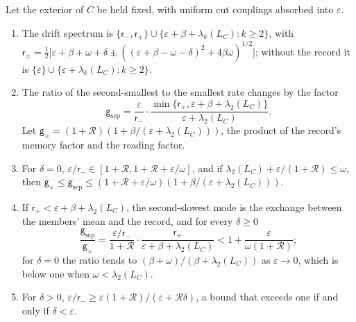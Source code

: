 \begin{proposition}\label{prop:hie-record-gain}
Let the exterior of $C$ be held fixed, with uniform cut couplings absorbed into $\varepsilon$.
\begin{enumerate}
\item[(a)] The drift spectrum is $\{\mathsf r_-,\mathsf r_+\}\cup\{\varepsilon+\beta+\lambda_k(L_C):k\ge2\}$, with $\mathsf r_\pm=\frac12\bigl[\varepsilon+\beta+\omega+\delta\pm((\varepsilon+\beta-\omega-\delta)^2+4\beta\omega)^{1/2}\bigr]$; without the record it is $\{\varepsilon\}\cup\{\varepsilon+\lambda_k(L_C):k\ge2\}$.
\item[(b)] The ratio of the second-smallest to the smallest rate changes by the factor
\begin{equation}\label{eq:hie-gain}
\mathsf g_{\mathrm{sep}}=\frac{\varepsilon}{\mathsf r_-}\cdot\frac{\min\{\mathsf r_+,\varepsilon+\beta+\lambda_2(L_C)\}}{\varepsilon+\lambda_2(L_C)}.
\end{equation}
Let $\mathsf g_\times=(1+\mathcal R)(1+\beta/(\varepsilon+\lambda_2(L_C)))$, the product of the record's memory factor and the reading factor.
\item[(c)] For $\delta=0$, $\varepsilon/\mathsf r_-\in[1+\mathcal R,1+\mathcal R+\varepsilon/\omega]$, and if $\lambda_2(L_C)+\varepsilon/(1+\mathcal R)\le\omega$, then $\mathsf g_\times\le\mathsf g_{\mathrm{sep}}\le(1+\mathcal R+\varepsilon/\omega)(1+\beta/(\varepsilon+\lambda_2(L_C)))$.
\item[(d)] If $\mathsf r_+<\varepsilon+\beta+\lambda_2(L_C)$, the second-slowest mode is the exchange between the members' mean and the record, and for every $\delta\ge0$
\begin{equation}\label{eq:hie-gain-ratio}
\frac{\mathsf g_{\mathrm{sep}}}{\mathsf g_\times}=\frac{\varepsilon/\mathsf r_-}{1+\mathcal R}\cdot\frac{\mathsf r_+}{\varepsilon+\beta+\lambda_2(L_C)}<1+\frac{\varepsilon}{\omega(1+\mathcal R)};
\end{equation}
for $\delta=0$ the ratio tends to $(\beta+\omega)/(\beta+\lambda_2(L_C))$ as $\varepsilon\to0$, which is below one when $\omega<\lambda_2(L_C)$.
\item[(e)] For $\delta>0$, $\varepsilon/\mathsf r_-\ge\varepsilon(1+\mathcal R)/(\varepsilon+\mathcal R\delta)$, a bound that exceeds one if and only if $\delta<\varepsilon$.
\end{enumerate}
\end{proposition}

